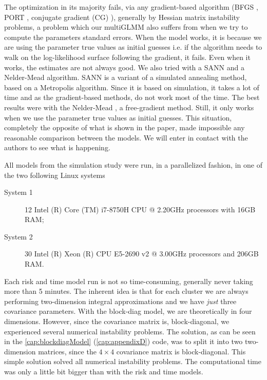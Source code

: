 The optimization in its majority fails, via any gradient-based algorithm
(BFGS \cite{nocedal&wright}, PORT \cite{PORTreport, PORTpaper},
conjugate gradient (CG) \cite{CG}), generally by Hessian matrix
instability problems, a problem which our multiGLMM also suffers from
when we try to compute the parameters standard errors. When the model
works, it is because we are using the parameter true values as initial
guesses i.e. if the algorithm needs to walk on the log-likelihood
surface following the gradient, it fails. Even when it works, the
estimates are not always good. We also tried with a SANN and a
Nelder-Mead algorithm. SANN \cite{SANN} is a variant of a simulated
annealing method, based on a Metropolis algorithm. Since it is based on
simulation, it takes a lot of time and as the gradient-based methods, do
not work most of the time. The best results were with the Nelder-Mead
\cite{neldermead}, a free-gradient method. Still, it only works when we
use the parameter true values as initial guesses. This situation,
completely the opposite of what is shown in the paper, made impossible
any reasonable comparison between the models. We will enter in contact
with the authors to see what is happening.

All models from the simulation study were run, in a parallelized
fashion, in one of the two following Linux systems
\begin{description}
 \item[System 1]
  12 Intel (R) Core (TM) i7-8750H CPU @ 2.20GHz processors
  with 16GB RAM;
 \item[System 2]
  30 Intel (R) Xeon (R) CPU E5-2690 v2 @ 3.00GHz processors
  and 206GB RAM.
\end{description}

Each risk and time model run is not so time-consuming, generally never
taking more than 5 minutes. The inherent idea is that for each cluster
we are always performing two-dimension integral approximations and we
have \textit{just} three covariance parameters. With the block-diag
model, we are theoretically in four dimensions. However, since the
covariance matrix is, block-diagonal, we experienced several numerical
instability problems. The solution, as can be seen in the
\autoref{cap:blockdiagModel} (\autoref{cap:appendixD}) code, was to
split it into two two-dimension matrices, since the \(4\times4\)
covariance matrix is block-diagonal.  This simple solution solved all
numerical instability problems. The computational time was only a little
bit bigger than with the risk and time models.

